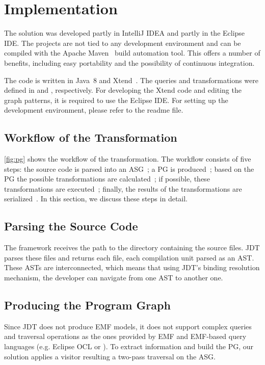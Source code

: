 \documentclass[submission,copyright,creativecommons]{eptcs}
\begin{document}
\section{Implementation}

The solution was developed partly in IntelliJ IDEA and partly in the Eclipse IDE. The projects are not tied to any development environment and can be compiled with the Apache Maven~\cite{Maven} build automation tool. This offers a number of benefits, including easy portability and the possibility of continuous integration.

The code is written in Java~8 and Xtend~\cite{Xtend}. The queries and transformations were defined in \eiq and \viatra, respectively. For developing the Xtend code and editing the graph patterns, it is required to use the Eclipse IDE. For setting up the development environment, please refer to the readme file. 

\subsection{Workflow of the Transformation}


\noindent\autoref{fig:pg} shows the workflow of the transformation. The workflow consists of five steps: the source code is parsed into an ASG~; a PG is produced~; based on the PG the possible transformations are calculated~; if possible, these transformations are executed~; finally, the results of the transformations are serialized~. In this section, we discuss these steps in detail.

\subsection[Parsing the Source Code]{Parsing the Source Code\qquad{}}
The framework receives the path to the directory containing the source files. JDT parses these files and returns each file, each compilation unit parsed as an AST. These ASTs are interconnected, which means that using JDT's binding resolution mechanism, the developer can navigate from one AST to another one.

\subsection[Producing the Program Graph]{Producing the Program Graph\qquad{}}
Since JDT does not produce EMF models, it does not support complex queries and traversal operations as the ones provided by EMF and EMF-based query languages (e.g. Eclipse OCL or \eiq). To extract information and build the PG, our solution applies a visitor resulting a two-pass traversal on the ASG.
\end{document}
